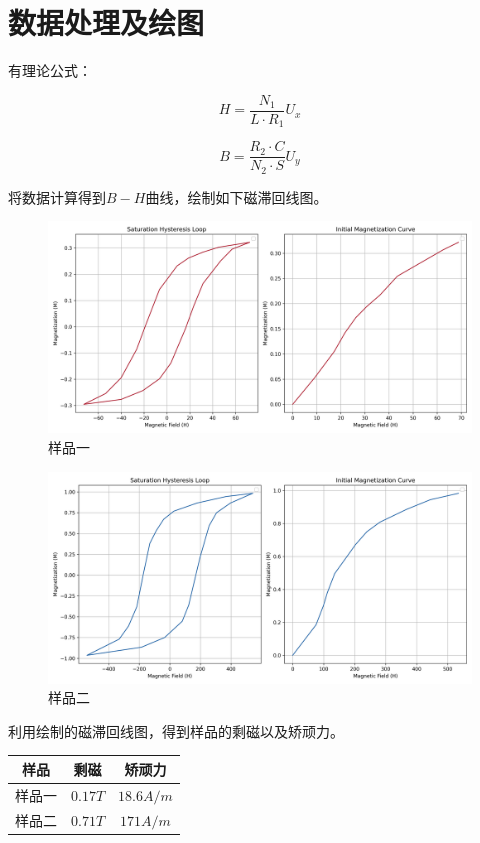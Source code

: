 \documentclass{ctexart}
\begin{document}
\newpage

\section{数据处理及绘图}

有理论公式：

$$ H = \frac{N_1}{L \cdot R_1} U_x $$

$$ B = \frac{R_2 \cdot C}{N_2\cdot S} U_y $$

将数据计算得到$B-H$曲线，绘制如下磁滞回线图。

\begin{figure}[!h]
    \centering
    \includegraphics[width=\textwidth]{0.png}
    \caption{样品一}
\end{figure}

\begin{figure}[!h]
    \centering
    \includegraphics[width=\textwidth]{1.png}
    \caption{样品二}
\end{figure}

利用绘制的磁滞回线图，得到样品的剩磁以及矫顽力。

\begin{table}
    \renewcommand{\arraystretch}{1.2}
    \centering
    \begin{tabular}{ccc}
        \toprule
        \textbf{样品} & \textbf{剩磁} & \textbf{矫顽力} \\
        \midrule
        样品一 & $0.17 T$ & $18.6 A/m$ \\
        
        样品二 & $0.71 T$ & $171 A/m$ \\
        \bottomrule
    \end{tabular}
\end{table}
\end{document}
